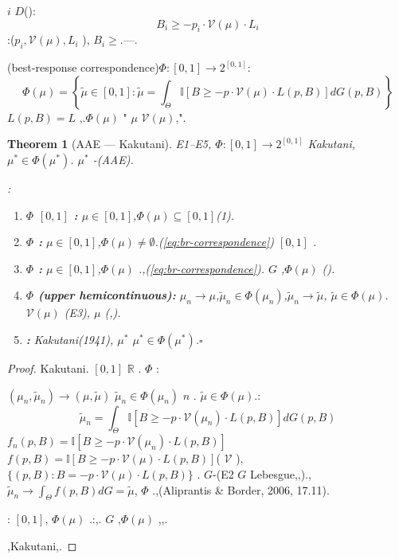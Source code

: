 \documentclass[12pt,a4paper]{article}
\newtheorem{theorem}{Theorem}[section]
\theoremstyle{definition}
\theoremstyle{remark}
\begin{document}
 $i$  $D$():
\begin{equation}
B_i \geq -p_i \cdot \mathcal{V}(\mu) \cdot L_i
\label{eq:adopt-condition}
\end{equation}
:($p_i, \mathcal{V}(\mu), L_i$ ), $B_i \geq \text{}$.---.

\textbf{}(best-response correspondence)$\Phi: [0,1] \to 2^{[0,1]}$:
\begin{equation}
\Phi(\mu) = \left\{ \tilde{\mu} \in [0,1] : \tilde{\mu} = \int_{\Theta} \mathbb{I}\left[B \geq -p \cdot \mathcal{V}(\mu) \cdot L(p, B)\right] dG(p, B) \right\}
\label{eq:br-correspondence}
\end{equation}
 $L(p, B) = L$ ,.$\Phi(\mu)$ " $\mu$  $\mathcal{V}(\mu)$,".

\begin{theorem}[AAE --- Kakutani]
\label{thm:aae-fixed-point}
E1--E5, $\Phi: [0,1] \to 2^{[0,1]}$ Kakutani, $\mu^* \in \Phi(\mu^*)$. $\mu^*$ -(AAE).

:
\begin{enumerate}[label=(\roman*), itemsep=6pt]
\item \textbf{$\Phi$  $[0,1]$ :}  $\mu \in [0,1]$,$\Phi(\mu) \subseteq [0,1]$(1).

\item \textbf{$\Phi$ :}  $\mu \in [0,1]$,$\Phi(\mu) \neq \emptyset$.\hfill\textit{(\ref{eq:br-correspondence}) $[0,1]$ .}

\item \textbf{$\Phi$ :}  $\mu \in [0,1]$,$\Phi(\mu)$ .\hfill\textit{,(\ref{eq:br-correspondence}). $G$ ,$\Phi(\mu)$ ().}

\item \textbf{$\Phi$ (upper hemicontinuous):}  $\mu_n \to \mu$,$\tilde{\mu}_n \in \Phi(\mu_n)$,$\tilde{\mu}_n \to \tilde{\mu}$, $\tilde{\mu} \in \Phi(\mu)$.\hfill\textit{ $\mathcal{V}(\mu)$ (E3), $\mu$ (,).}

\item \textbf{:} Kakutani(1941), $\mu^*$  $\mu^* \in \Phi(\mu^*)$.\hfill$\square$
\end{enumerate}
\end{theorem}

\begin{proof}
Kakutani. $[0,1]$  $\mathbb{R}$ . $\Phi$ :

 $(\mu_n, \tilde{\mu}_n) \to (\mu, \tilde{\mu})$  $\tilde{\mu}_n \in \Phi(\mu_n)$  $n$ . $\tilde{\mu} \in \Phi(\mu)$.:
\begin{equation}
\tilde{\mu}_n = \int_{\Theta} \mathbb{I}\left[B \geq -p \cdot \mathcal{V}(\mu_n) \cdot L(p, B)\right] dG(p, B)
\end{equation}
 $f_n(p, B) = \mathbb{I}[B \geq -p \cdot \mathcal{V}(\mu_n) \cdot L(p, B)]$  $f(p, B) = \mathbb{I}[B \geq -p \cdot \mathcal{V}(\mu) \cdot L(p, B)]$( $\mathcal{V}$ ), $\{(p, B) : B = -p \cdot \mathcal{V}(\mu) \cdot L(p, B)\}$ . $G$-(E2 $G$ Lebesgue,,).,$\tilde{\mu}_n \to \int_{\Theta} f(p, B) dG = \tilde{\mu}$, $\Phi$ .,(Aliprantis \& Border, 2006, 17.11).

: $[0,1]$, $\Phi(\mu)$ .:,. $G$ ,$\Phi(\mu)$ ,,.

,Kakutani,.
\end{proof}
\end{document}
